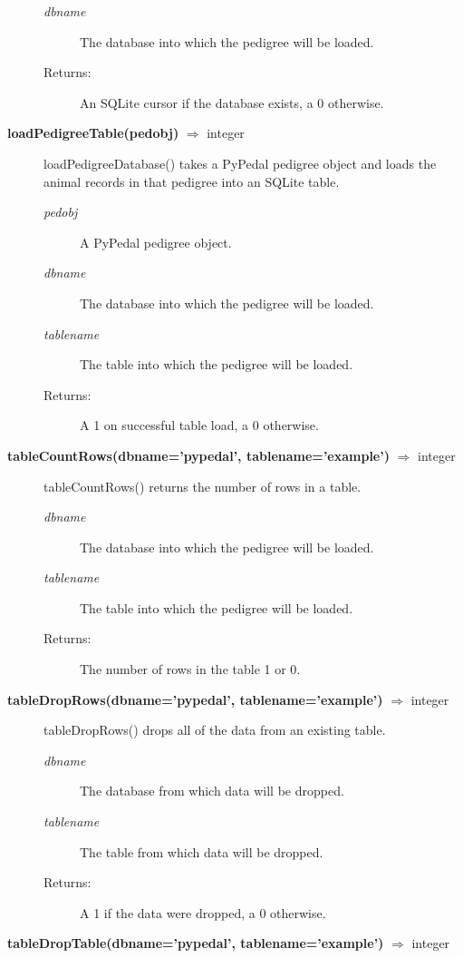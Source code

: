 \begin{description}
\begin{description}
\item[\emph{dbname}] The database into which the pedigree will be loaded.
\item[Returns:] An SQLite cursor if the database exists, a 0 otherwise.
\end{description}
\item[\textbf{loadPedigreeTable(pedobj)} $\Rightarrow$ integer]
loadPedigreeDatabase() takes a PyPedal pedigree object and loads the animal records in that pedigree into an SQLite table.
\begin{description}
\item[\emph{pedobj}] A PyPedal pedigree object.
\item[\emph{dbname}] The database into which the pedigree will be loaded.
\item[\emph{tablename}] The table into which the pedigree will be loaded.
\item[Returns:] A 1 on successful table load, a 0 otherwise.
\end{description}
\item[\textbf{tableCountRows(dbname='pypedal', tablename='example')} $\Rightarrow$ integer]
tableCountRows() returns the number of rows in a table.
\begin{description}
\item[\emph{dbname}] The database into which the pedigree will be loaded.
\item[\emph{tablename}] The table into which the pedigree will be loaded.
\item[Returns:] The number of rows in the table 1 or 0.
\end{description}
\item[\textbf{tableDropRows(dbname='pypedal', tablename='example')} $\Rightarrow$ integer]
tableDropRows() drops all of the data from an existing table.
\begin{description}
\item[\emph{dbname}] The database from which data will be dropped.
\item[\emph{tablename}] The table from which data will be dropped.
\item[Returns:] A 1 if the data were dropped, a 0 otherwise.
\end{description}
\item[\textbf{tableDropTable(dbname='pypedal', tablename='example')} $\Rightarrow$ integer]

\end{description}
